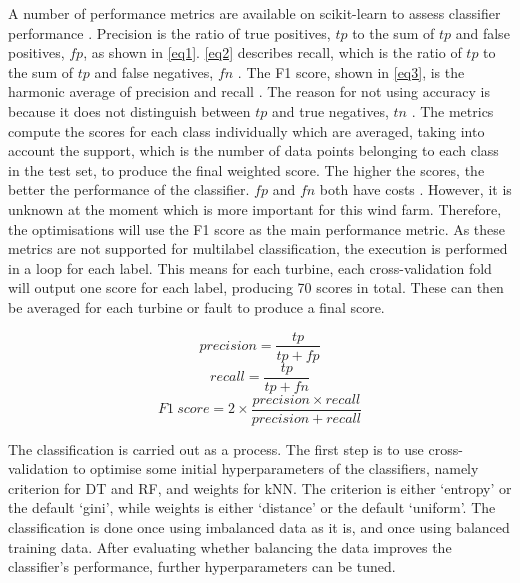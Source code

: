 A number of performance metrics are available on scikit-learn to assess
classifier performance \cite{33M}. Precision is the ratio of true positives,
\ensuremath{tp} to the sum of \ensuremath{tp} and false positives,
\ensuremath{fp}, as shown in \eqref{eq1}. \eqref{eq2} describes recall, which
is the ratio of \ensuremath{tp} to the sum of \ensuremath{tp} and false
negatives, \ensuremath{fn} \cite{deRu15}. The F1 score, shown in \eqref{eq3},
is the harmonic average of precision and recall \cite{Perfo}. The reason for
not using accuracy is because it does not distinguish between \ensuremath{tp}
and true negatives, \ensuremath{tn} \cite{Perfo,SASH}. The metrics compute the
scores for each class individually which are averaged, taking into account the
support, which is the number of data points belonging to each class in the
test set, to produce the final weighted score. The higher the scores, the
better the performance of the classifier. \ensuremath{fp} and \ensuremath{fn}
both have costs \cite{Perfo}. However, it is unknown at the moment which is
more important for this wind farm. Therefore, the optimisations will use the
F1 score as the main performance metric. As these metrics are not supported
for multilabel classification, the execution is performed in a loop for each
label. This means for each turbine, each cross-validation fold will output one
score for each label, producing 70 scores in total. These can then be averaged
for each turbine or fault to produce a final score.

\begin{equation}
  \label{eq1}
  precision = \frac{tp}{tp + fp}
\end{equation}
\begin{equation}
  \label{eq2}
  recall = \frac{tp}{tp + fn}
\end{equation}
\begin{equation}
  \label{eq3}
  F1~score = 2 \times \frac{precision \times recall}{precision + recall}
\end{equation}

The classification is carried out as a process. The first step is to use
cross-validation to optimise some initial hyperparameters of the classifiers,
namely criterion for DT and RF, and weights for kNN. The criterion is either
`entropy' or the default `gini', while weights is either `distance' or the
default `uniform'. The classification is done once using imbalanced data as it
is, and once using balanced training data. After evaluating whether balancing
the data improves the classifier's performance, further hyperparameters can be
tuned.

